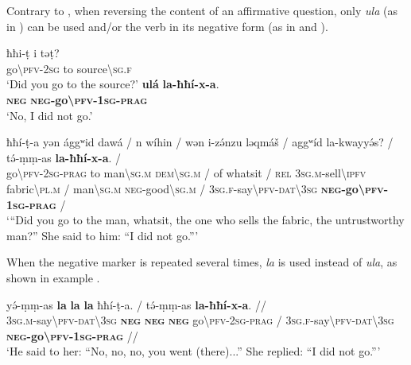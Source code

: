 \documentclass[output=paper,colorlinks,citecolor=brown]{langscibook}
\begin{document}
Contrary to , when reversing the content of an affirmative question, only \textit{ula} (as in ) can be used and/or the verb in its negative form (as in  and ).

\ea\label{ex:siw:44}
\begin{xlist}[A: ]
        \gll ħħi-ṭ i təṭ? \\
             go{\textbackslash}\textsc{pfv}{}-2\textsc{sg} to source{\textbackslash}\textsc{sg.f} \\
        \glt ‘Did you go to the source?’
        \gll  \textbf{ul\'{a}} \textbf{la-ħħ\'{i}-x-a}.\\
             \textbf{\textsc{neg}} \textbf{\textsc{neg}-go{\textbackslash}\textsc{pfv}-1\textsc{sg-prag}} \\
        \glt ‘No, I did not go.’
\end{xlist}
\z

\ea\label{ex:siw:45}
    \gll ħħ\'{i}-ṭ-a yən \'{a}ggʷid dawá / n w\'{i}hin / wən i-zə́nzu ləqmáš / aggʷíd la-kwayy\'{ə}s? / tə́-ṃṃ-as \textbf{la-ħħí-x-a}. /\\
          go{\textbackslash}\textsc{pfv-2sg-prag} to man{\textbackslash}\textsc{sg.m} \textsc{dem{\textbackslash}sg.m} / of whatsit / \textsc{rel} \textsc{3sg.m}-sell{\textbackslash}\textsc{ipfv} fabric{\textbackslash}\textsc{pl.m} /  man{\textbackslash}\textsc{sg.m} \textsc{neg}-good{\textbackslash}\textsc{sg.m} / \textsc{3sg.f}-say{\textbackslash}\textsc{pfv-dat\textbackslash3sg} \textbf{\textsc{neg}-go{\textbackslash}\textsc{pfv}-\textsc{1sg}-\textsc{prag}} / \\
    \glt ‘“Did you go to the man, whatsit, the one who sells the fabric, the untrustworthy man?” She said to him: “I did not go.”’
\z

When the negative marker is repeated several times, \textit{la} is used instead of \textit{ula}, as shown in example .


\ea\label{ex:siw:46}
    \gll yə́-ṃṃ{}-as \textbf{la} \textbf{la} \textbf{la} ħħí-ṭ{}-a. / tə́-ṃṃ{}-as \textbf{la-ħħí-x-a}. // \\
         \textsc{3sg.m}-say{\textbackslash}\textsc{pfv-dat\textbackslash3sg}  \textbf{\textsc{neg}} \textbf{\textsc{neg}} \textbf{\textsc{neg}} go{\textbackslash}\textsc{pfv-2sg-prag} / \textsc{3sg.f}-say{\textbackslash}\textsc{pfv-dat\textbackslash3sg} \textbf{\textsc{neg}-go{\textbackslash}\textsc{pfv}-\textsc{1sg-prag}} // \\
    \glt ‘He said to her: “No, no, no, you went (there)...” She replied: “I did not go.”’ 
\z
\end{document}

